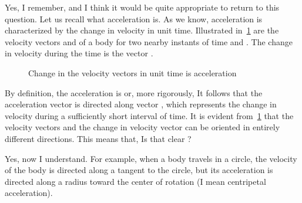 \begin{p}
Yes, I remember, and I think it would be quite appropriate to return to this question. Let us recall what acceleration is. As we know, acceleration is characterized by the change in velocity in unit time. Illustrated in~\cref{fig:18} are the velocity vectors  and  of a body for two nearby instants of time  and . The change in velocity during the time  is the vector . 

\begin{figure}[H]
\centering
{}

\caption{Change in the velocity vectors in unit time is acceleration}
\label{fig:18}
\end{figure}

By definition, the acceleration is
or, more rigorously,
It follows that the acceleration vector is directed along vector , which represents the change in velocity during a sufficiently short interval of time. It is evident from~\cref{fig:18} that the velocity vectors and the change in velocity vector can be oriented in entirely different directions. This means that,  Is that clear ?
\end{p}



\begin{s}
Yes, now I understand. For example, when a body travels in a circle, the velocity of the body is directed along a tangent to the circle, but its acceleration is directed along a radius toward the center of rotation (I mean centripetal acceleration).
\end{s}


